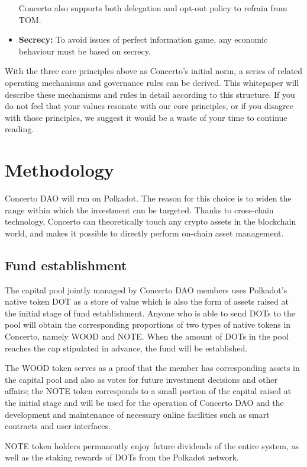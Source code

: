 \documentclass[UTF8]{article}
\begin{document}
\begin{multicols}{2}
\begin{itemize}
   Concerto also supports both delegation and opt-out policy to refrain from TOM.

\item \textbf{Secrecy:}
   To avoid issues of perfect information game, any economic behaviour must be based on secrecy.

\end{itemize}

With the three core principles above as Concerto’s initial norm, a series of related operating mechanisms and governance rules can be derived. This whitepaper will describe these mechanisms and rules in detail according to this structure. If you do not feel that your values resonate with our core principles, or if you disagree with those principles, we suggest it would be a waste of your time to continue reading.

\section{Methodology}

Concerto DAO will run on Polkadot. The reason for this choice is to widen the range within which the investment can be targeted. Thanks to cross-chain technology, Concerto can theoretically touch any crypto assets in the blockchain world, and makes it possible to directly perform on-chain asset management.

\subsection{Fund establishment}
The capital pool jointly managed by Concerto DAO members uses Polkadot’s native token DOT as a store of value which is also the form of assets raised at the initial stage of fund establishment. Anyone who is able to send DOTs to the pool will obtain the corresponding proportions of two types of native tokens in Concerto, namely WOOD and NOTE. When the amount of DOTs in the pool reaches the cap stipulated in advance, the fund will be established.

The WOOD token serves as a proof that the member has corresponding assets in the capital pool and also as votes for future investment decisions and other affairs; the NOTE token corresponds to a small portion of the capital raised at the initial stage and will be used for the operation of Concerto DAO and the development and maintenance of necessary online facilities such as smart contracts and user interfaces.

NOTE token holders permanently enjoy future dividends of the entire system, as well as the staking rewards of DOTs from the Polkadot network.



\end{multicols}
\end{document}
